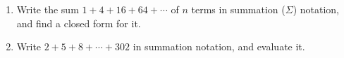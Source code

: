 \begin{enumerate}
\item[(a)] Write the sum $1+4+16+64+\cdots$ of $n$ terms in summation ($\Sigma$) notation, and find a closed form for it.
\item[(b)] Write $2+5+8+\cdots+302$ in summation notation, and evaluate it.
\end{enumerate}
